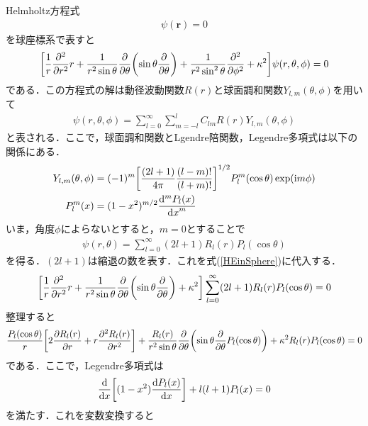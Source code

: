 \documentclass{report}
\begin{document}
  Helmholtz方程式
  \begin{align}
    [\nabla^2 + \kappa^2]\psi(\bm{r}) = 0
  \end{align}
  を球座標系で表すと
  \begin{align}
    \label{HEinSphere}
    \qty[\frac{1}{r}\frac{\partial^2}{\partial r^2}r + \frac{1}{r^2 \sin \theta} \frac{\partial}{\partial \theta}\qty(\sin\theta\frac{\partial}{\partial \theta})
    + \frac{1}{r^2 \sin^2\theta}\frac{\partial^2}{\partial \phi^2} + \kappa^2]\psi(r,\theta,\phi) = 0
  \end{align}
  である．この方程式の解は動径波動関数$R(r)$と球面調和関数$Y_{l,m}(\theta, \phi)$を用いて
  \begin{align}
    \psi(r,\theta,\phi) = \sum_{l=0}^{\infty}\sum_{m=-l}^{l}C_{lm}R(r)Y_{l,m}(\theta,\phi)
  \end{align}
  と表される．ここで，球面調和関数とLgendre陪関数，Legendre多項式は以下の関係にある．
  \begin{align}
    Y_{l,m}(\theta,\phi) &= (-1)^m \qty[\frac{(2l+1)}{4\pi}\frac{(l-m)!}{(l+m)!}]^{1/2}P_l^m(\cos\theta)\exp(\mathrm{i} m\phi)\\
    P_l^m(x) &= (1-x^2)^{m/2} \frac{\mathrm{d}^m P_l(x)}{\dd{x}^m}
  \end{align}
  いま，角度$\phi$によらないとすると，$m=0$とすることで
  \begin{align}
    \psi(r,\theta) = \sum_{l=0}^{\infty} (2l+1)R_l(r)P_l(\cos\theta)
  \end{align}
  を得る．$(2l+1)$は縮退の数を表す．これを式(\ref{HEinSphere})に代入する．
  \begin{align}
    \qty[\frac{1}{r}\frac{\partial^2}{\partial r^2}r + \frac{1}{r^2 \sin \theta} \frac{\partial}{\partial \theta}\qty(\sin\theta\frac{\partial}{\partial \theta})
    + \kappa^2] \sum_{l=0}^{\infty} (2l+1)R_l(r)P_l(\cos\theta)= 0
  \end{align}
  整理すると
  \begin{align}
    \frac{P_l(\cos\theta)}{r}\qty[2\frac{\partial R_l(r)}{\partial r} + r \frac{\partial^2 R_l(r)}{\partial r^2}]
    + \frac{R_l(r)}{r^2 \sin \theta} \frac{\partial}{\partial \theta}\qty(\sin\theta\frac{\partial}{\partial\theta}P_l(\cos\theta)) + \kappa^2 R_l(r)P_l(\cos\theta) = 0
  \end{align}
  である．ここで，Legendre多項式は
  \begin{align}
    \frac{\mathrm{d}}{\dd{x}}\qty[(1-x^2)\frac{\mathrm{d}P_l(x)}{\dd{x}}] + l(l+1)P_l(x) = 0
  \end{align}
  を満たす．これを変数変換すると
\end{document}
